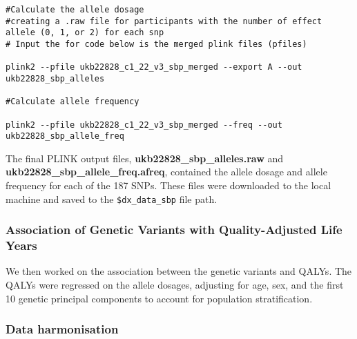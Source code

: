 \documentclass[11pt]{article}
\begin{document}
\begin{lstlisting}[style=BashStyle]
#Calculate the allele dosage 
#creating a .raw file for participants with the number of effect allele (0, 1, or 2) for each snp
# Input the for code below is the merged plink files (pfiles)

plink2 --pfile ukb22828_c1_22_v3_sbp_merged --export A --out ukb22828_sbp_alleles

#Calculate allele frequency 

plink2 --pfile ukb22828_c1_22_v3_sbp_merged --freq --out ukb22828_sbp_allele_freq

\end{lstlisting}

\color{black}
The final PLINK output files, \textbf{ukb22828\_sbp\_alleles.raw} and \textbf{ukb22828\_sbp\_allele\_freq.afreq}, contained the allele dosage and allele frequency for each of the 187 SNPs. These files were downloaded to the local machine and saved to the \texttt{\$dx\_data\_sbp} file path.

\subsubsection{Association of Genetic Variants with Quality-Adjusted Life Years}

We then worked on the association between the genetic variants and QALYs. The QALYs were regressed on the allele dosages, adjusting for age, sex, and the first 10 genetic principal components to account for population stratification.
\color{violet}
\begin{stlog}\end{stlog}
\color{black}
\newpage
\subsubsection{Data harmonisation}
\end{document}
